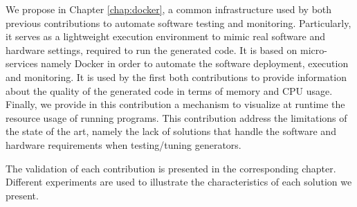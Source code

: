 \begin{itemize}
	We propose in Chapter \ref{chap:docker}, a common infrastructure used by both previous contributions to automate software testing and monitoring. Particularly, it serves as a lightweight execution environment to mimic real software and hardware settings, required to run the generated code. It is based on micro-services namely Docker in order to automate the software deployment, execution and monitoring. It is used by the first both contributions to provide information about the quality of the generated code in terms of memory and CPU usage. Finally, we provide in this contribution a mechanism to visualize at runtime the resource usage of running programs. This contribution address the limitations of the state of the art, namely the lack of solutions that handle the software and hardware requirements when testing/tuning generators.
\end{itemize}

The validation of each contribution is presented in the corresponding chapter. Different experiments are used to illustrate the characteristics of each solution we present.



